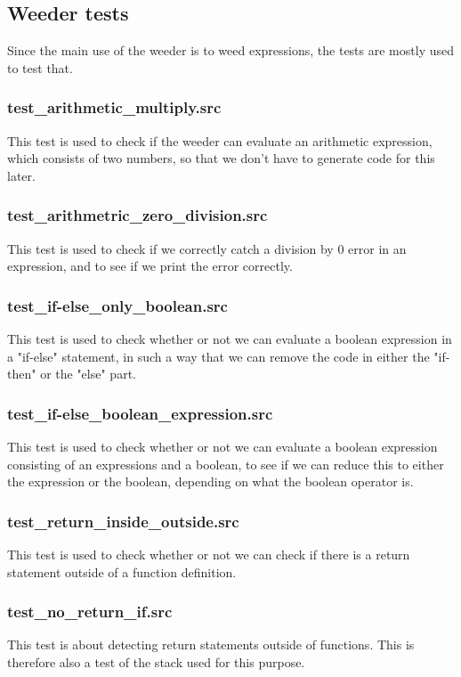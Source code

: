 \documentclass[a4paper,10pt,titlepage]{report}
\begin{document}
\subsection{Weeder tests}
Since the main use of the weeder is to weed expressions, the tests are mostly used to test that.

\subsubsection{test\_arithmetic\_multiply.src}
This test is used to check if the weeder can evaluate an arithmetic expression, which consists of two numbers, so that we don't have to generate code for this later.

\subsubsection{test\_arithmetric\_zero\_division.src}
This test is used to check if we correctly catch a division by 0 error in an expression, and to see if we print the error correctly.

\subsubsection{test\_if-else\_only\_boolean.src}
This test is used to check whether or not we can evaluate a boolean expression in a "if-else" statement, in such a way that we can remove the code in either the "if-then" or the "else" part.

\subsubsection{test\_if-else\_boolean\_expression.src}
This test is used to check whether or not we can evaluate a boolean expression consisting of an expressions and a boolean, to see if we can reduce this to either the expression or the boolean, depending on what the boolean operator is.

\subsubsection{test\_return\_inside\_outside.src}
This test is used to check whether or not we can check if there is a return statement outside of a function definition.

\subsubsection{test\_no\_return\_if.src}
This test is about detecting return statements outside of functions. This is therefore also a test of the stack used for this purpose.
\end{document}
